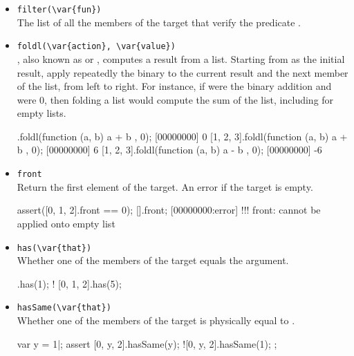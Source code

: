 \begin{itemize}
\item \lstinline|filter(\var{fun})|\\
  The list of all the members of the target that verify the predicate
  .


\item \lstinline|foldl(\var{action}, \var{value})|\\
  ,
  also known as  or , computes a result
  from a list.  Starting from  as the initial result, apply
  repeatedly the binary  to the current result and the
  next member of the list, from left to right.  For instance, if
   were the binary addition and  were 0, then
  folding a list would compute the sum of the list, including for
  empty lists.

\begin{urbiscript}
[].foldl(function (a, b) { a + b }, 0);
[00000000] 0
[1, 2, 3].foldl(function (a, b) { a + b }, 0);
[00000000] 6
[1, 2, 3].foldl(function (a, b) { a - b }, 0);
[00000000] -6
\end{urbiscript}

\item \lstinline|front|\\
  Return the first element of the target. An error if the target is
  empty.
\begin{urbiscript}
assert([0, 1, 2].front == 0);
[].front;
[00000000:error] !!! front: cannot be applied onto empty list
\end{urbiscript}

\item \lstinline|has(\var{that})|\\
  Whether one of the members of the target equals the argument.

\begin{urbiassert}
[0, 1, 2].has(1);
! [0, 1, 2].has(5);
\end{urbiassert}

\item \lstinline|hasSame(\var{that})|\\
  Whether one of the members of the target is physically equal to
  .
\begin{urbiscript}
var y = 1|;
assert
{
  [0, y, 2].hasSame(y);
  ![0, y, 2].hasSame(1);
};
\end{urbiscript}


\end{itemize}
